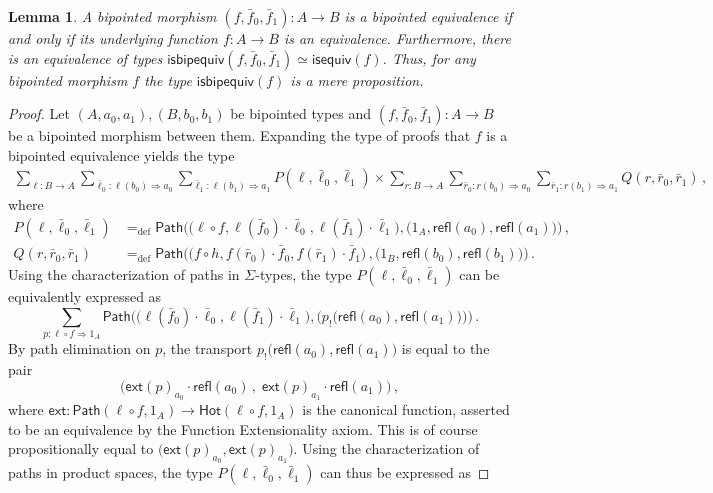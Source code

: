 \documentclass[10pt,a4paper,oneside,reqno]{amsart}
\numberwithin{equation}{section}
\theoremstyle{mythm}
\newtheorem{lemma}[theorem]{Lemma}
\theoremstyle{mydef}
\theoremstyle{myrmk}
\newcommand{\defeq}{=_{\mathrm{def}}}
\newcommand{\co}{\colon}
\newcommand{\comp}{\circ}
\newcommand{\ct}{\cdot}
\newcommand{\isequiv}{\mathsf{isequiv}}
\newcommand{\ext}{\mathsf{ext}}
\newcommand{\Hot}{\mathsf{Hot}}
\newcommand{\Id}{\mathsf{Path}}
\newcommand{\refl}{\mathsf{refl}}
\newcommand{\isbipequiv}{\mathsf{isbipequiv}}
\begin{document}
\begin{lemma}\label{BoolAlgSpace}  \label{thm:usemere}
A bipointed morphism $(f, \bar{f}_0, \bar{f}_1) \co A \to B$ is a bipointed equivalence if and only
if its underlying function $f \co A \to B$ is an equivalence. Furthermore, there is an equivalence of types
$\isbipequiv(f, \bar{f}_0, \bar{f}_1)  \simeq \isequiv(f)$. 
Thus, for any bipointed morphism $f$ the type $\isbipequiv(f)$ is a mere proposition.
\end{lemma}  

\begin{proof}
Let $(A,a_0,a_1), (B,b_0,b_1)$ be bipointed types and $(f, \bar{f}_0, \bar{f}_1) \co A \to B$ be a bipointed morphism between them. Expanding the type of 
proofs that $f$ is a bipointed equivalence yields the type
\begin{multline*}
 \sum_{\ell \co B \to  A}  
 \sum_{\bar{\ell}_0 \co \ell(b_0) \Rightarrow a_0} 
 \sum_{\bar{\ell}_1 \co \ell(b_1) \Rightarrow a_1} 
 P(\ell,\bar{\ell}_0,\bar{\ell}_1) \times 
 \sum_{r \co B \to A} 
 \sum_{\bar{r}_0 \co r(b_0) \Rightarrow a_0} 
 \sum_{\bar{r}_1 \co  r(b_1) \Rightarrow a_1} 
 Q(r,\bar{r}_0,\bar{r}_1)   \, ,
\end{multline*}
where
\begin{align*}
P(\ell,\bar{\ell}_0,\bar{\ell}_1) & \defeq \Id \Big( \big( \ell \comp f, \ell(\bar{f}_0) \ct \bar{\ell}_0, \ell(\bar{f}_1) \ct \bar{\ell}_1\big), \big( 1_A, \refl(a_0), \refl(a_1) \big) \Big)  \, , \\
Q(r,\bar{r}_0,\bar{r}_1) & \defeq \Id \Big( \big( f \comp h,   f(\bar{r}_0) \ct \bar{f}_0, f(\bar{r}_1) \ct \bar{f}_1  \big) \, , \big( 1_B, \refl(b_0), \refl(b_1) \big) \Big) \, .
\end{align*}
Using the characterization of paths in $\Sigma$-types, the type $P(\ell,\bar{\ell}_0,\bar{\ell}_1)$ can be equivalently expressed as
\[
\sum_{p \co \ell \comp f \Rightarrow 1_A}  
\Id \Big(  \big( \ell (\bar{f}_0) \ct \bar{\ell }_0, \ell (\bar{f}_1) \ct \bar{\ell }_1\big), \big( p_{!}\big(\refl(a_0), \refl(a_1) \big) \big) \Big) \, .
\]
By path elimination on $p$, the transport $p_{!}\big(\refl(a_0), \refl(a_1) \big)$ is equal to the pair 
\[
\big(  \ext(p)_{a_0} \ct \refl(a_0) \, , \;  \ext(p)_{a_1} \ct \refl(a_1) \big) \, ,
\]
where $\ext : \Id(\ell \comp f, 1_A) \to \Hot(\ell \comp f,  1_A)$ is the canonical function, asserted to be an equivalence by the Function Extensionality axiom. This is of course propositionally equal to $\big(\ext(p)_{a_0}, \ext(p)_{a_1} \big)$. Using the characterization of paths in product spaces, the type $P(\ell,\bar{\ell}_0,\bar{\ell}_1)$ can thus be expressed as

\end{proof}
\end{document}

